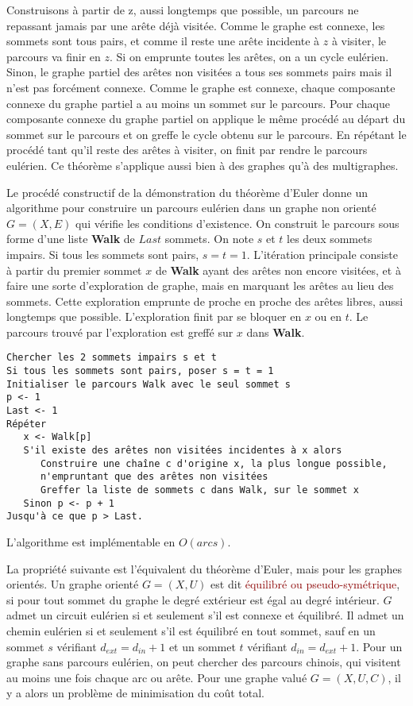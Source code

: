 \documentclass{article}
\newcommand{\red}[1]{\textcolor{darkred}{#1}}
\begin{document}
Construisons à partir de z, aussi longtemps que possible, un parcours ne repassant jamais par une arête déjà visitée. Comme le graphe est connexe, les sommets sont tous pairs, et 
comme il reste une arête incidente à $z$ à visiter, le parcours va finir en $z$. Si on emprunte toutes les arêtes, on a un cycle eulérien. Sinon, le graphe partiel des arêtes non 
visitées a tous ses sommets pairs mais il n’est pas forcément connexe. Comme le graphe est connexe, chaque composante connexe du graphe partiel a au moins un sommet sur le
parcours. Pour chaque composante connexe du graphe partiel on applique le même procédé au départ du sommet sur le parcours et on greffe le cycle obtenu sur le parcours. En 
répétant le procédé tant qu’il reste des arêtes à visiter, on finit par rendre le parcours eulérien. Ce théorème s’applique aussi bien à des graphes qu’à des multigraphes.

Le procédé constructif de la démonstration du théorème d’Euler donne un algorithme pour construire un parcours eulérien dans un graphe non orienté $G=(X,E)$ qui vérifie les 
conditions d’existence. On construit le parcours sous forme d’une liste \textbf{Walk} de $Last$ sommets. On note $s$ et $t$ les deux sommets impairs. Si tous les sommets sont 
pairs, $s=t=1$. L’itération principale consiste à partir du premier sommet $x$ de \textbf{Walk} ayant des arêtes non encore visitées, et à faire une sorte d’exploration de graphe, 
mais en marquant les arêtes au lieu des sommets. Cette exploration emprunte de proche en proche des arêtes libres, aussi longtemps que possible. L’exploration finit par se bloquer 
en $x$ ou en $t$. Le parcours trouvé par l’exploration est greffé sur $x$ dans \textbf{Walk}.

\begin{verbatim}
Chercher les 2 sommets impairs s et t
Si tous les sommets sont pairs, poser s = t = 1
Initialiser le parcours Walk avec le seul sommet s
p <- 1
Last <- 1
Répéter
   x <- Walk[p]
   S'il existe des arêtes non visitées incidentes à x alors 
      Construire une chaîne c d'origine x, la plus longue possible,
      n'empruntant que des arêtes non visitées
      Greffer la liste de sommets c dans Walk, sur le sommet x
   Sinon p <- p + 1
Jusqu'à ce que p > Last.
\end{verbatim}
L'algorithme est implémentable en $O(arcs)$.

La propriété suivante est l’équivalent du théorème d’Euler, mais pour les graphes orientés. Un graphe orienté $G=(X,U)$ est dit \red{équilibré ou pseudo-symétrique}, si pour tout 
sommet du graphe le degré extérieur est égal au degré intérieur. $G$ admet un circuit eulérien si et seulement s’il est connexe et équilibré. Il admet un chemin eulérien si et 
seulement s’il est équilibré en tout sommet, sauf en un sommet $s$ vérifiant $d_{ext} = d_{in} + 1$ et un sommet $t$ vérifiant $d_{in} = d_{ext} + 1$. Pour un graphe sans 
parcours eulérien, on peut chercher des parcours chinois, qui visitent au moins une fois chaque arc ou arête. Pour une graphe valué $G=(X,U,C)$, il y a alors un problème de 
minimisation du coût total. \\
\end{document}
